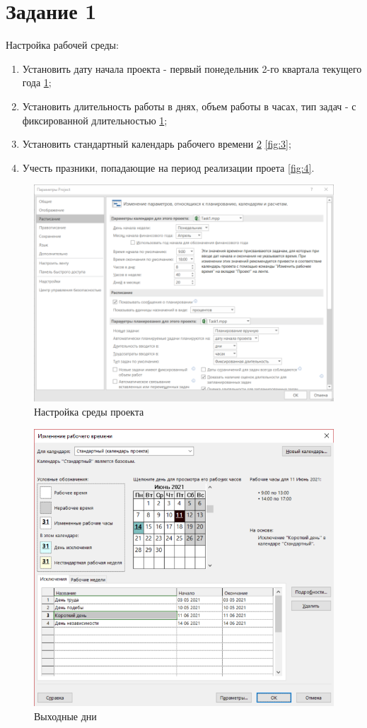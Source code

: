 \section{Задание 1}

Настройка рабочей среды:
\begin{enumerate}
	\item Установить дату начала проекта - первый понедельник 2-го квартала текущего года \ref{fig:1};
	\item Установить длительность работы в днях, объем работы в часах, тип задач - с фиксированной длительностью \ref{fig:1};
	\item Установить стандартный календарь рабочего времени \ref{fig:2} \ref{fig:3};
	\item Учесть празники, попадающие на период реализации проета \ref{fig:4}.
\end{enumerate}
\begin{figure}[H]
	\centering
	\includegraphics[width=0.7\linewidth]{src/1}
	\caption{Настройка среды проекта}
	\label{fig:1}
\end{figure}
\begin{figure}[H]
	\centering
	\includegraphics[width=0.7\linewidth]{src/2}
	\caption{Выходные дни}
	\label{fig:2}
\end{figure}
